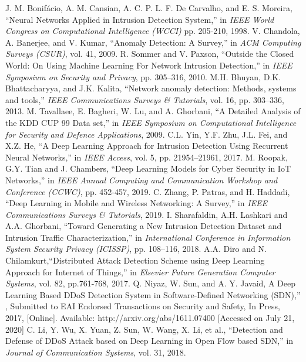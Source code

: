 \documentclass[conference]{IEEEtran}
\begin{document}
\begin{thebibliography}{00}
 J. M. Bonif{\'a}cio,  A. M. Cansian, A. C. P. L. F. De Carvalho, and
E. S. Moreira, ``Neural Networks Applied in Intrusion Detection System,'' in \textit{IEEE World Congress on Computational Intelligence (WCCI)} pp. 205-210, 1998.
 V. Chandola, A. Banerjee, and V. Kumar, ``Anomaly Detection: A Survey,'' in \textit{ACM Computing Surveys (CSUR)}, vol. 41, 2009.
  R. Sommer and V. Paxson, ``Outside the Closed World:
On Using Machine Learning For Network Intrusion Detection,'' in \textit{IEEE Symposium on Security and Privacy}, pp. 305–316, 2010.
 M.H. Bhuyan, D.K. Bhattacharyya, and J.K. Kalita, ``Network anomaly detection: Methods, systems and tools,'' \textit{IEEE Communications Surveys \& Tutorials}, vol. 16, pp. 303–336, 2013.
 M. Tavallaee, E. Bagheri, W. Lu, and A. Ghorbani, ``A Detailed Analysis of the KDD CUP 99 Data set,'' in \textit{IEEE Symposium on Computational Intelligence for Security and Defence Applications}, 2009.
 C.L. Yin, Y.F. Zhu, J.L. Fei, and X.Z. He, ``A Deep Learning Approach for Intrusion Detection Using Recurrent Neural Networks,'' in \textit{IEEE Access}, vol. 5, pp. 21954–21961, 2017.
 M. Roopak, G.Y. Tian and J. Chambers, ``Deep Learning Models for Cyber Security in IoT Networks,'' in \textit{IEEE Annual Computing and Communication Workshop and Conference (CCWC)}, pp. 452-457, 2019.
 C. Zhang, P. Patras, and H. Haddadi, ``Deep Learning in Mobile and Wireless Networking: A Survey,'' in \textit{IEEE Communications Surveys \& Tutorials}, 2019. 
 I. Sharafaldin, A.H. Lashkari and A.A. Ghorbani, ``Toward Generating a New Intrusion Detection Dataset and Intrusion Traffic Characterization,'' in \textit{International Conference in Information System Security Privacy (ICISSP)}, pp. 108–116, 2018.
 A.A. Diro and N. Chilamkurt,``Distributed Attack Detection Scheme using Deep Learning Approach for Internet of Things,'' in \textit{Elsevier Future Generation Computer Systems}, vol. 82, pp.761-768, 2017.
 Q. Niyaz, W. Sun, and A. Y. Javaid, A Deep Learning Based DDoS Detection System in Software-Defined Networking (SDN),'' , Submitted to EAI
Endorsed Transactions on Security and Safety, In Press, 2017, [Online].
Available: http://arxiv.org/abs/1611.07400 [Accessed on July 21, 2020]
 C. Li, Y. Wu, X. Yuan, Z. Sun, W. Wang, X. Li, et al., ``Detection and Defense of DDoS Attack based on Deep Learning in Open Flow based SDN,'' in \textit{Journal of Communication Systems}, vol. 31, 2018.

\end{thebibliography}
\end{document}
